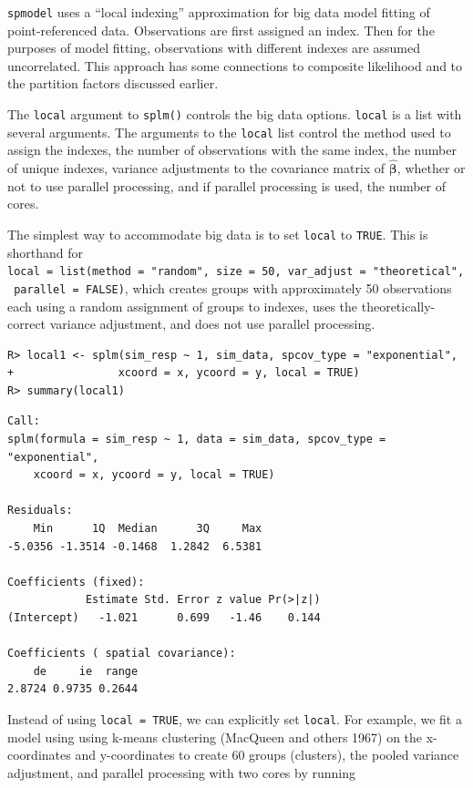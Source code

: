 \documentclass{article}
\begin{document}
\texttt{spmodel} uses a ``local indexing'' approximation for big data
model fitting of point-referenced data. Observations are first assigned
an index. Then for the purposes of model fitting, observations with
different indexes are assumed uncorrelated. This approach has some
connections to composite likelihood and to the partition factors
discussed earlier.

The \texttt{local} argument to \texttt{splm()} controls the big data
options. \texttt{local} is a list with several arguments. The arguments
to the \texttt{local} list control the method used to assign the
indexes, the number of observations with the same index, the number of
unique indexes, variance adjustments to the covariance matrix of
\(\hat{\boldsymbol{\beta}}\), whether or not to use parallel processing,
and if parallel processing is used, the number of cores.

The simplest way to accommodate big data is to set \texttt{local} to
\texttt{TRUE}. This is shorthand for
\texttt{local\ =\ list(method\ =\ "random",\ size\ =\ 50,\ var\_adjust\ =\ "theoretical",\ parallel\ =\ FALSE)},
which creates groups with approximately 50 observations each using a
random assignment of groups to indexes, uses the theoretically-correct
variance adjustment, and does not use parallel processing.

\begin{verbatim}
R> local1 <- splm(sim_resp ~ 1, sim_data, spcov_type = "exponential", 
+                xcoord = x, ycoord = y, local = TRUE)
R> summary(local1)
\end{verbatim}

\begin{verbatim}
Call:
splm(formula = sim_resp ~ 1, data = sim_data, spcov_type = "exponential", 
    xcoord = x, ycoord = y, local = TRUE)

Residuals:
    Min      1Q  Median      3Q     Max 
-5.0356 -1.3514 -0.1468  1.2842  6.5381 

Coefficients (fixed):
            Estimate Std. Error z value Pr(>|z|)
(Intercept)   -1.021      0.699   -1.46    0.144

Coefficients ( spatial covariance):
    de     ie  range 
2.8724 0.9735 0.2644 
\end{verbatim}

Instead of using \texttt{local\ =\ TRUE}, we can explicitly set
\texttt{local}. For example, we fit a model using using k-means
clustering (MacQueen and others 1967) on the x-coordinates and
y-coordinates to create 60 groups (clusters), the pooled variance
adjustment, and parallel processing with two cores by running
\end{document}
